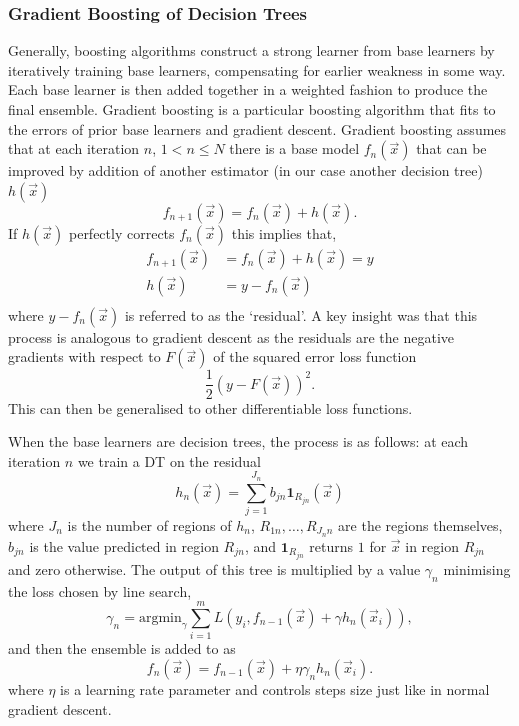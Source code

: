 \subsubsection{Gradient Boosting of Decision Trees}
Generally, boosting algorithms \cite{Boosting} construct a strong learner from base learners by iteratively training base learners, compensating for earlier weakness in some way. Each base learner is then added together in a weighted fashion to produce the final ensemble.
Gradient boosting \cite{GradientBoosting} is a particular boosting algorithm that fits to the errors of prior base learners and gradient descent. Gradient boosting assumes that at each iteration $n$, $1<n\leq{N}$ there is a base model $f_{n}(\vec{x})$ that can be improved by addition of another estimator (in our case another decision tree) $h(\vec{x})$
\begin{equation}
    f_{n+1}(\vec{x}) = f_{n}(\vec{x}) + h(\vec{x}).
\end{equation}
If $h(\vec{x})$ perfectly corrects $f_{n}(\vec{x})$ this implies that,
\begin{equation}
    \begin{split}
        f_{n+1}(\vec{x}) &= f_{n}(\vec{x}) + h(\vec{x}) = y \\
        h(\vec{x}) &= y - f_{n}(\vec{x}) \\
    \end{split}
\end{equation}
where $y - f_{n}(\vec{x})$ is referred to as the `residual'. A key insight was that this process is analogous to gradient descent as the residuals are the negative gradients with respect to $F(\vec{x})$ of the squared error loss function
\begin{equation}
    \frac{1}{2}(y-F(\vec{x}))^{2}.
\end{equation}
This can then be generalised to other differentiable loss functions. 

When the base learners are decision trees, the process is as follows: at each iteration $n$ we train a DT on the residual 
\begin{equation}
    h_{n}(\vec{x}) = \sum_{j=1}^{J_{n}}b_{jn}\mathbf{1}_{R_{jn}}(\vec{x})
\end{equation}
where $J_n$ is the number of regions of $h_{n}$, $R_{1n},\dots,R_{J_{n}n}$ are the regions themselves, $b_{jn}$ is the value predicted in region $R_{jn}$, and $\mathbf{1}_{R_{jn}}$ returns $1$ for $\vec{x}$ in region $R_{jn}$ and zero otherwise. 
The output of this tree is multiplied by a value $\gamma_{n}$ minimising the loss chosen by line search,
\begin{equation}
    \gamma_{n} = \mathrm{argmin}_{\gamma}\sum_{i=1}^{m}L(y_{i},f_{n-1}(\vec{x})+\gamma{}h_{n}(\vec{x}_{i})),
\end{equation}
and then the ensemble is added to as
\begin{equation}
    f_{n}(\vec{x}) = f_{n-1}(\vec{x}) +\eta\gamma_{n}h_{n}(\vec{x}_{i}).
\end{equation}
where $\eta$ is a learning rate parameter and controls steps size just like in normal gradient descent. 




